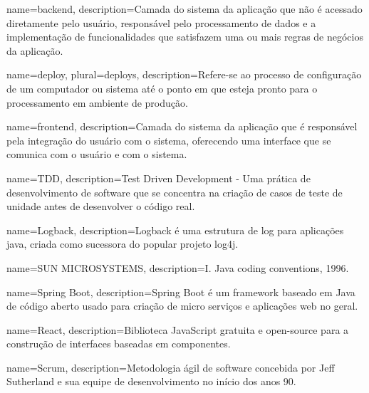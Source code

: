 



 {
	name=backend,
	description={Camada do sistema da aplicação que não é acessado diretamente pelo usuário, responsável pelo processamento de dados e a implementação de funcionalidades que satisfazem uma ou mais regras de negócios da aplicação.}
}

 {
	name=deploy,
	plural=deploys,
	description={Refere-se ao processo de configuração de um computador ou sistema até o ponto em que esteja pronto para o processamento em ambiente de produção.}
}

 {
	name=frontend,
	description={Camada do sistema da aplicação que é responsável pela integração do usuário com o sistema, oferecendo uma interface que se comunica com o usuário e com o sistema.}
}

 {
	name=TDD,
	description={Test Driven Development - Uma prática de desenvolvimento de software que se concentra na criação de casos de teste de unidade antes de desenvolver o código real.}
}

 {
	name=Logback,
	description={Logback é uma estrutura de log para aplicações java, criada como sucessora do popular projeto log4j.}
}

 {
	name=SUN MICROSYSTEMS,
	description={I. Java coding conventions, 1996.}
}

 {
	name=Spring Boot,
	description={Spring Boot é um \gls{framework} baseado em Java de código aberto usado para criação de micro serviços e aplicações web no geral.}
}

 {
	name=React,
	description={Biblioteca JavaScript gratuita e open-source para a construção de interfaces baseadas em componentes.}
}

 {
	name=Scrum,
	description={Metodologia ágil de software concebida por Jeff Sutherland e sua equipe de desenvolvimento no início dos anos 90.}
}

